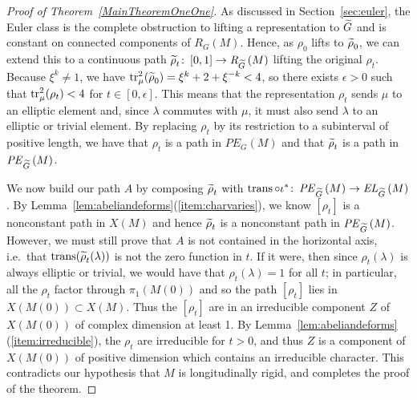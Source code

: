 \documentclass[tikz, sepfignums, defaultenums]{nmd/article}
\newcommand{\RG}[1]{\mathit{R}_{G}\left(#1\right)}
\newcommand{\RGPE}[1]{\mathit{PE}_{G}\left(#1\right)}
\newcommand{\RGtil}[1]{\mathit{R}_{\Gtil}\left(#1\right)}
\newcommand{\RGtilPE}[1]{\mathit{PE}_{\Gtil}\left(#1\right)}
\newcommand{\inc}{\iota}
\DeclareMathOperator{\trans}{trans}
\newcommand{\TEL}[1]{\mathit{EL}_\Gtil\left(#1\right)}
\begin{document}
\begin{proof}[Proof of Theorem~\ref{MainTheoremOneOne}]
As discussed in Section~\ref{sec:euler}, the Euler class is the
complete obstruction to lifting a representation to $\Gtil$ and is
constant on connected components of $\RG{M}$.  Hence, as $\rho_0$
lifts to $\rhotil_0$, we can extend this to a continuous path
$\rhotil_t \maps [0, 1] \to \RGtil{M}$ lifting the original $\rho_t$.
Because $\xi^k \neq 1$, we have
$\tr^2_\mu(\rhotil_0) = \xi^k + 2 + \xi^{-k} < 4$, so there exists
$\epsilon > 0$ such that $\operatorname{tr}^2_\mu(\rho_t) < 4$ for
$t \in [0,\epsilon]$.  This means that the representation $\rho_t$
sends $\mu$ to an elliptic element and, since $\lambda$ commutes with
$\mu$, it must also send $\lambda$ to an elliptic or trivial element.
By replacing $\rho_t$ by its restriction to a subinterval of positive
length, we have that $\rho_t$ is a path in $\RGPE{M}$ and that
$\rhotil_t$ is a path in $\RGtilPE{M}$.

We now build our path $A$ by composing $\rhotil_t$ with
$\trans \circ \inc^* \maps \RGtilPE{M} \to \TEL{M}$.  By
Lemma~\ref{lem:abeliandeforms}(\ref{item:charvaries}), we know
$[\rho_t]$ is a nonconstant path in $X(M)$ and hence $\rhotil_t$ is a
nonconstant path in $\RGtilPE{M}$. However, we must still prove that
$A$ is not contained in the horizontal axis, i.e.~that
$\trans(\rhotil_t(\lambda))$ is not the zero function in $t$.  If it
were, then since $\rho_t(\lambda)$ is always elliptic or trivial, we
would have that $\rho_t(\lambda) = 1$ for all $t$; in particular, all
the $\rho_t$ factor through $\pi_1\left(M(0)\right)$ and so the path
$[\rho_t]$ lies in $X\!\left(M(0)\right) \subset X(M)$.  Thus the
$[\rho_t]$ are in an irreducible component $Z$ of
$X\!\left(M(0)\right)$ of complex dimension at least 1.  By
Lemma~\ref{lem:abeliandeforms}(\ref{item:irreducible}), the $\rho_t$
are irreducible for $t > 0$, and thus $Z$ is a component of
$X\!\left(M(0)\right)$ of positive dimension which contains an
irreducible character.  This contradicts our hypothesis that $M$ is
longitudinally rigid, and completes the proof of the theorem.
\end{proof}
\end{document}
